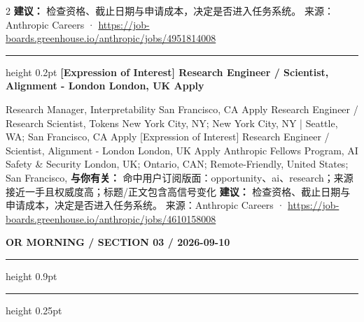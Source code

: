 \documentclass[10.5pt]{ctexart}
\begin{document}
\begin{multicols}{2}
\textbf{建议：} 检查资格、截止日期与申请成本，决定是否进入任务系统。
{\footnotesize\color{ormuted} 来源：Anthropic Careers · \url{https://job-boards.greenhouse.io/anthropic/jobs/4951814008}}
\vspace{2mm}
\hrule height 0.2pt
\vspace{2mm}
{\large\bfseries [Expression of Interest] Research Engineer / Scientist, Alignment - London London, UK Apply}\par
[Expression of Interest] Research Manager, Interpretability San Francisco, CA Apply Research Engineer / Research Scientist, Tokens New York City, NY; New York City, NY | Seattle, WA; San Francisco, CA Apply [Expression of Interest] Research Engineer / Scientist, Alignment - London London, UK Apply Anthropic Fellows Program, AI Safety \& Security London, UK; Ontario, CAN; Remote-Friendly, United States; San Francisco, 
\textbf{与你有关：} 命中用户订阅版面：opportunity、ai、research；来源接近一手且权威度高；标题/正文包含高信号变化
\textbf{建议：} 检查资格、截止日期与申请成本，决定是否进入任务系统。
{\footnotesize\color{ormuted} 来源：Anthropic Careers · \url{https://job-boards.greenhouse.io/anthropic/jobs/4610158008}}
\end{multicols}
\newpage
{\small\bfseries OR MORNING / SECTION 03 / 2026-09-10}
\vspace{2mm}
\hrule height 0.9pt
\vspace{1.5mm}
\hrule height 0.25pt
\vspace{4mm}
\end{document}
